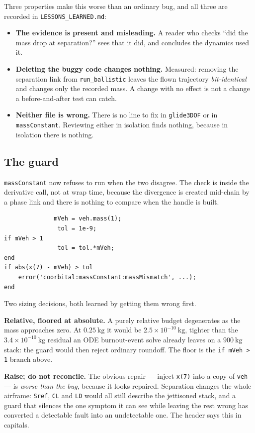 \documentclass[11pt]{article}
\newcommand{\code}[1]{\texttt{#1}}
\begin{document}
Three properties make this worse than an ordinary bug, and all three are
recorded in \code{LESSONS\_LEARNED.md}:

\begin{itemize}
\item \textbf{The evidence is present and misleading.} A reader who checks
``did the mass drop at separation?'' sees that it did, and concludes the
dynamics used it.
\item \textbf{Deleting the buggy code changes nothing.} Measured: removing the
separation link from \code{run\_ballistic} leaves the flown trajectory
\emph{bit-identical} and changes only the recorded mass. A change with no
effect is not a change a before-and-after test can catch.
\item \textbf{Neither file is wrong.} There is no line to fix in
\code{glide3DOF} or in \code{massConstant}. Reviewing either in isolation finds
nothing, because in isolation there is nothing.
\end{itemize}

\subsection{The guard}

\code{massConstant} now refuses to run when the two disagree. The check is
inside the derivative call, not at wrap time, because the divergence is created
mid-chain by a phase link and there is nothing to compare when the handle is
built.

\begin{lstlisting}
              mVeh = veh.mass(1);
               tol = 1e-9;
if mVeh > 1
               tol = tol.*mVeh;
end
if abs(x(7) - mVeh) > tol
    error('coorbital:massConstant:massMismatch', ...);
end
\end{lstlisting}

Two sizing decisions, both learned by getting them wrong first.

\textbf{Relative, floored at absolute.} A purely relative budget degenerates as
the mass approaches zero. At $0.25~\mathrm{kg}$ it would be
$2.5\times10^{-10}~\mathrm{kg}$, tighter than the
$3.4\times10^{-10}~\mathrm{kg}$ residual an ODE burnout-event solve already
leaves on a $900~\mathrm{kg}$ stack: the guard would then reject ordinary
roundoff. The floor is the \code{if mVeh > 1} branch above.

\textbf{Raise; do not reconcile.} The obvious repair --- inject \code{x(7)}
into a copy of \code{veh} --- is \emph{worse than the bug}, because it looks
repaired. Separation changes the whole airframe: \code{Sref}, \code{CL} and
\code{LD} would all still describe the jettisoned stack, and a guard that
silences the one symptom it can see while leaving the rest wrong has converted
a detectable fault into an undetectable one. The header says this in capitals.
\end{document}
